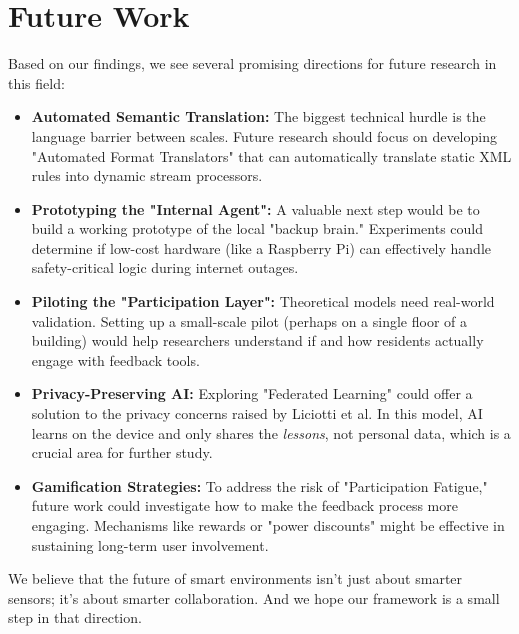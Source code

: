 \documentclass[a4paper,oneside,12pt]{report}
\begin{document}
\section{Future Work}
Based on our findings, we see several promising directions for future research in this field:
\begin{itemize}
    \item \textbf{Automated Semantic Translation:} The biggest technical hurdle is the language barrier between scales. Future research should focus on developing "Automated Format Translators" that can automatically translate static XML rules into dynamic stream processors.
    \item \textbf{Prototyping the "Internal Agent":} A valuable next step would be to build a working prototype of the local "backup brain." Experiments could determine if low-cost hardware (like a Raspberry Pi) can effectively handle safety-critical logic during internet outages.
    \item \textbf{Piloting the "Participation Layer":} Theoretical models need real-world validation. Setting up a small-scale pilot (perhaps on a single floor of a building) would help researchers understand if and how residents actually engage with feedback tools.
    \item \textbf{Privacy-Preserving AI:} Exploring "Federated Learning" could offer a solution to the privacy concerns raised by Liciotti et al. In this model, AI learns on the device and only shares the \textit{lessons}, not personal data, which is a crucial area for further study.
    \item \textbf{Gamification Strategies:} To address the risk of "Participation Fatigue," future work could investigate how to make the feedback process more engaging. Mechanisms like rewards or "power discounts" might be effective in sustaining long-term user involvement.
\end{itemize}

We believe that the future of smart environments isn't just about smarter sensors; it's about smarter collaboration. And we hope our framework is a small step in that direction.




\end{document}
